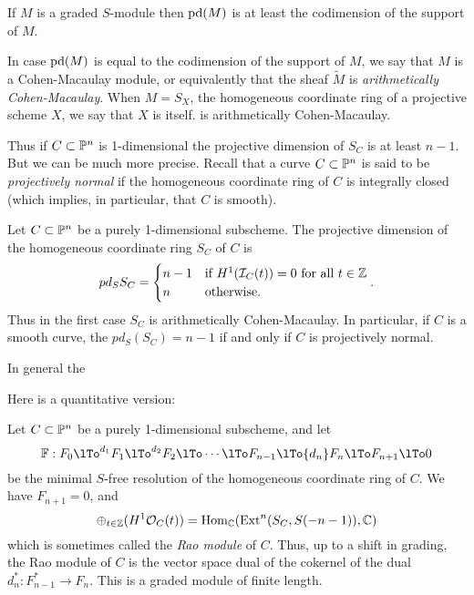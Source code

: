 \begin{proposition}
If $M$ is a graded $S$-module then $\operatorname{pd}(M)$ is at least the codimension of the support of $M$.
\end{proposition}

In case $\operatorname{pd}(M)$ is equal to the codimension of the support of $M$, we say that $M$ is a
Cohen-Macaulay module, or equivalently that the sheaf $\widetilde M$ is 
\emph{arithmetically Cohen-Macaulay}. When $M = S_{X}$, the homogeneous coordinate ring of a projective scheme $X$, we say that $X$ is itself. is arithmetically Cohen-Macaulay.

Thus if $C\subset {\mathbb P}^{n}$ is 1-dimensional the projective dimension of $S_{C}$ is at least $n-1$. But we can be much more precise. Recall that a curve $C\subset {\mathbb P}^{n}$ is said to be \emph{projectively normal} if the homogeneous coordinate ring of $C$ is integrally closed (which implies, in particular, that $C$ is smooth).

\begin{theorem}
 Let $C\subset {\mathbb P}^{n}$ be a purely 1-dimensional subscheme. The projective dimension of the homogeneous coordinate ring $S_{C}$ of $C$  is
$$
 pd_{S}S_{C} = 
\begin{cases}
n-1 &\hbox{if $H^{1}({\mathcal I}_{C}(t)) = 0$ for all $t\in {\mathbb Z}$}\\
n &\hbox{otherwise}.
\end{cases}.
$$
Thus in the first case $S_{C}$ is arithmetically Cohen-Macaulay. In particular, if $C$ is a smooth curve, the $pd_{S}(S_{C}) = n-1$ if and only if $C$ is projectively normal. 
\end{theorem}

In general the 

Here is a quantitative version:

\begin{theorem}
Let $C\subset {\mathbb P}^{n}$ be a purely 1-dimensional subscheme, and let  
$$
\FF: F_{0}\lTo^{d_{1}} F_{1}\lTo^{d_{2}} F_{2}\lTo \cdots \lTo F_{n-1}\lTo {d_{n}}F_{n}\lTo F_{n+1} \lTo 0
$$
be the minimal $S$-free resolution of the homogeneous coordinate ring of $C$. We have $F_{n+1}=0$, and 
$$
\oplus_{t\in {\mathbb Z}} (H^{1}{\mathcal O}_{C}(t)) = \operatorname{Hom}_{{\mathbb C}}({\rm{Ext}}^{n}(S_{C}, S(-n-1)),{\mathbb C})
$$ 
which is sometimes called the \emph{Rao module} of $C$. Thus, up to a shift in grading,
the Rao module of $C$ is the vector space dual of the cokernel of the dual $d_{n}^{*}: F_{n-1}^{*}\to F_{n}$. This is a graded module of finite length.
\end{theorem}


